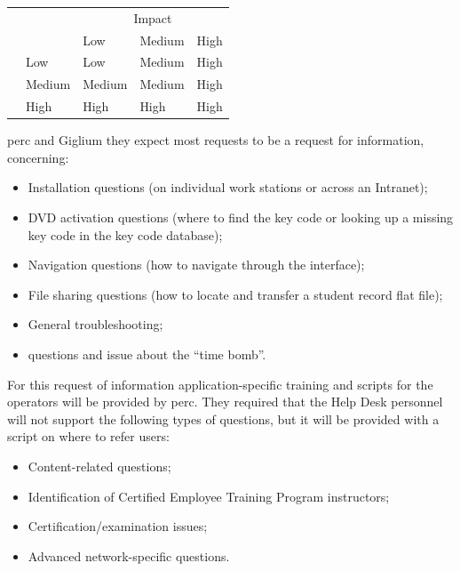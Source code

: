 \begin{table}[H]
	\centering
	\begin{tabular}{ | l | l | l | l | l | }
		\cline{3-5}
		\multicolumn{2}{c|}{}& \multicolumn{3}{|c|}{Impact}  \\ \cline{3-5}
		\multicolumn{2}{c|}{} &Low & Medium  & High \\ \hline
		\multirow{3}{*}{\rotatebox{90}{\tiny Urgency\,}} & Low & \cellcolor{green}Low & \cellcolor{yellow}Medium & \cellcolor{red}High\\ \cline{2-5}
		&   Medium & \cellcolor{yellow}Medium & \cellcolor{yellow}Medium & \cellcolor{red}High \\ \cline{2-5}
		&  High & \cellcolor{red}High & \cellcolor{red}High & \cellcolor{red}High \\ \hline
	\end{tabular}
	\label{tab:request-priority}
\end{table}
\gls{perc} and Giglium they expect most requests to be a request for information, concerning:
\begin{itemize}
	\item Installation questions (on individual work stations or across an Intranet);
	\item DVD activation questions (where to find the key code or looking up a missing key code in
	the key code database);
	\item Navigation questions (how to navigate through the interface);
	\item File sharing questions (how to locate and transfer a student record flat file);
	\item General troubleshooting;
	\item questions and issue about the “time bomb”.
\end{itemize}

For this request of information application-specific training and scripts for the operators will be provided by \gls{perc}. They required that the Help Desk personnel will not support the following types of questions, but it will be provided with a script on where to refer users:
\begin{itemize}
	\item Content-related questions;
	\item Identification of Certified Employee Training Program instructors;
	\item Certification/examination issues;
	\item Advanced network-specific questions.
\end{itemize}


